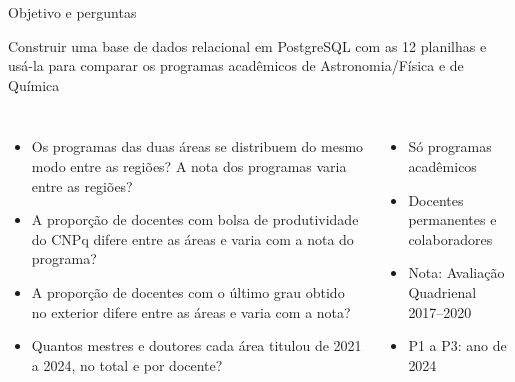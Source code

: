 \documentclass[aspectratio=169,10pt]{beamer}
\begin{document}
\begin{frame}{Objetivo e perguntas}
  \begin{block}{}
    Construir uma base de dados relacional em PostgreSQL com as 12 planilhas e usá-la para comparar os programas acadêmicos de Astronomia/Física e de Química
  \end{block}
  \vspace{0.5em}
  \begin{columns}[T]
    \begin{itemize}
      \item[\textbf{P1}] Os programas das duas áreas se distribuem do mesmo modo entre as regiões? A nota dos programas varia entre as regiões?
      \item[\textbf{P2}] A proporção de docentes com bolsa de produtividade do CNPq difere entre as áreas e varia com a nota do programa?
      \item[\textbf{P3}] A proporção de docentes com o último grau obtido no exterior difere entre as áreas e varia com a nota?
      \item[\textbf{P4}] Quantos mestres e doutores cada área titulou de 2021 a 2024, no total e por docente?
    \end{itemize}
    \small
    \begin{itemize}
      \item Só programas acadêmicos
      \item Docentes permanentes e colaboradores
      \item Nota: Avaliação Quadrienal 2017--2020
      \item P1 a P3: ano de 2024
    \end{itemize}
  \end{columns}
\end{frame}
\end{document}
